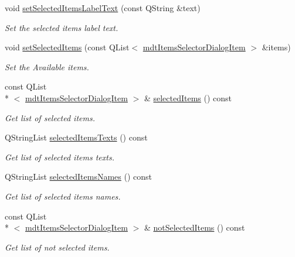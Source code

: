 \begin{DoxyCompactItemize}
void \hyperlink{classmdt_items_selector_dialog_a09e9df0c7cac2de513846916f47aa420}{set\-Selected\-Items\-Label\-Text} (const Q\-String \&text)
\begin{DoxyCompactList}\small\item\em Set the selected items label text. \end{DoxyCompactList}\item 
void \hyperlink{classmdt_items_selector_dialog_a02b2ea73af9b9688b90274b3d5b5428e}{set\-Selected\-Items} (const Q\-List$<$ \hyperlink{classmdt_items_selector_dialog_item}{mdt\-Items\-Selector\-Dialog\-Item} $>$ \&items)
\begin{DoxyCompactList}\small\item\em Set the Available items. \end{DoxyCompactList}\item 
const Q\-List\\*
$<$ \hyperlink{classmdt_items_selector_dialog_item}{mdt\-Items\-Selector\-Dialog\-Item} $>$ \& \hyperlink{classmdt_items_selector_dialog_a3fdcd8c8ccead9129b7ee7742a9150f4}{selected\-Items} () const 
\begin{DoxyCompactList}\small\item\em Get list of selected items. \end{DoxyCompactList}\item 
Q\-String\-List \hyperlink{classmdt_items_selector_dialog_adcb596a9e5d183a07a6c072ac7cf7eb0}{selected\-Items\-Texts} () const 
\begin{DoxyCompactList}\small\item\em Get list of selected items texts. \end{DoxyCompactList}\item 
Q\-String\-List \hyperlink{classmdt_items_selector_dialog_af8a1502d4856ceb6e4a4559565b3c385}{selected\-Items\-Names} () const 
\begin{DoxyCompactList}\small\item\em Get list of selected items names. \end{DoxyCompactList}\item 
const Q\-List\\*
$<$ \hyperlink{classmdt_items_selector_dialog_item}{mdt\-Items\-Selector\-Dialog\-Item} $>$ \& \hyperlink{classmdt_items_selector_dialog_af944e51b66c6e492ec74ec6030b281d4}{not\-Selected\-Items} () const 
\begin{DoxyCompactList}\small\item\em Get list of not selected items. \end{DoxyCompactList}\end{DoxyCompactItemize}


